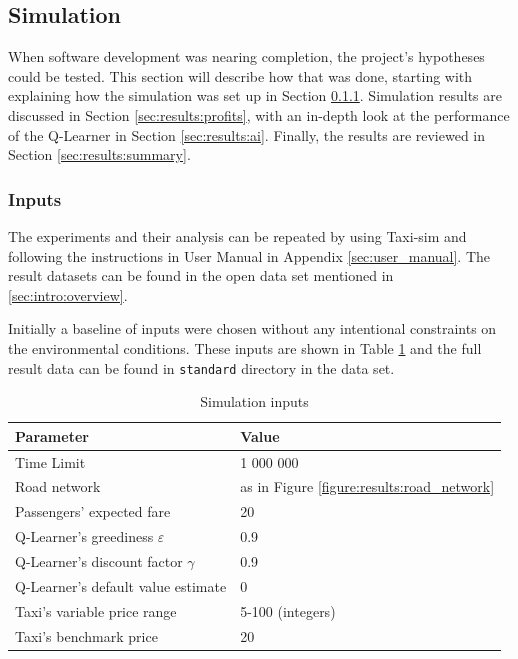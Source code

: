 \subsection{Simulation}
\label{sec:results}

When software development was nearing completion, the project's hypotheses
could be tested. This section will describe how that was done, starting with
explaining how the simulation was set up in Section \ref{sec:results:inputs}.
Simulation results are discussed in Section \ref{sec:results:profits}, with an
in-depth look at the performance of the Q-Learner in Section
\ref{sec:results:ai}. Finally, the results are reviewed in Section
\ref{sec:results:summary}.


\subsubsection{Inputs}
\label{sec:results:inputs}

The experiments and their analysis can be repeated by using Taxi-sim and
following the instructions in User Manual in Appendix \ref{sec:user_manual}.
The result datasets can be found in the open data set mentioned in
\ref{sec:intro:overview}.

Initially a baseline of inputs were chosen without any intentional constraints
on the environmental conditions. These inputs are shown in Table
\ref{table:input_data} and the full result data can be found in
\texttt{standard} directory in the data set.

\begin{table}
\begin{tabular}{ | l | l | }
  \hline
  Parameter & Value \\ \hline
  Time Limit & 1 000 000 \\
  Road network & as in Figure \ref{figure:results:road_network} \\
  Passengers' expected fare & 20 \\
  Q-Learner's greediness \(\varepsilon\) & 0.9 \\
  Q-Learner's discount factor \(\gamma\) & 0.9 \\
  Q-Learner's default value estimate & 0 \\
  Taxi's variable price range & 5-100 (integers) \\
  Taxi's benchmark price & 20 \\
  \hline
\end{tabular}
\caption{
  Simulation inputs
  \label{table:input_data}
}
\end{table}

